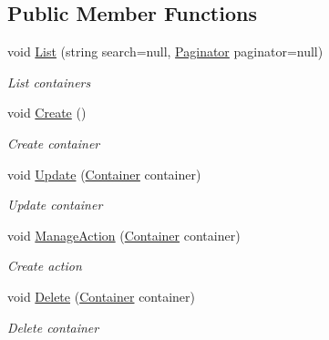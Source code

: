 \subsection*{Public Member Functions}
\begin{DoxyCompactItemize}
\item 
void \mbox{\hyperlink{class_gtd_app_1_1_console_1_1_controllers_1_1_container_controller_ad94aec28f62311b1b157b6776a0d0845}{List}} (string search=null, \mbox{\hyperlink{class_gtd_app_1_1_repository_1_1_paginator}{Paginator}} paginator=null)
\begin{DoxyCompactList}\small\item\em List containers \end{DoxyCompactList}\item 
void \mbox{\hyperlink{class_gtd_app_1_1_console_1_1_controllers_1_1_container_controller_a51a3c2c54d65464eb8c7623bd9280354}{Create}} ()
\begin{DoxyCompactList}\small\item\em Create container \end{DoxyCompactList}\item 
void \mbox{\hyperlink{class_gtd_app_1_1_console_1_1_controllers_1_1_container_controller_a3280a98b56c9f2fea9ef84ac2bccb41c}{Update}} (\mbox{\hyperlink{class_gtd_app_1_1_data_1_1_container}{Container}} container)
\begin{DoxyCompactList}\small\item\em Update container \end{DoxyCompactList}\item 
void \mbox{\hyperlink{class_gtd_app_1_1_console_1_1_controllers_1_1_container_controller_a1d1878b44eed9a95adb3352436b30eb8}{Manage\+Action}} (\mbox{\hyperlink{class_gtd_app_1_1_data_1_1_container}{Container}} container)
\begin{DoxyCompactList}\small\item\em Create action \end{DoxyCompactList}\item 
void \mbox{\hyperlink{class_gtd_app_1_1_console_1_1_controllers_1_1_container_controller_a3791a85cd5ba09afd3d23f6e5f33d69c}{Delete}} (\mbox{\hyperlink{class_gtd_app_1_1_data_1_1_container}{Container}} container)
\begin{DoxyCompactList}\small\item\em Delete container \end{DoxyCompactList}\end{DoxyCompactItemize}


